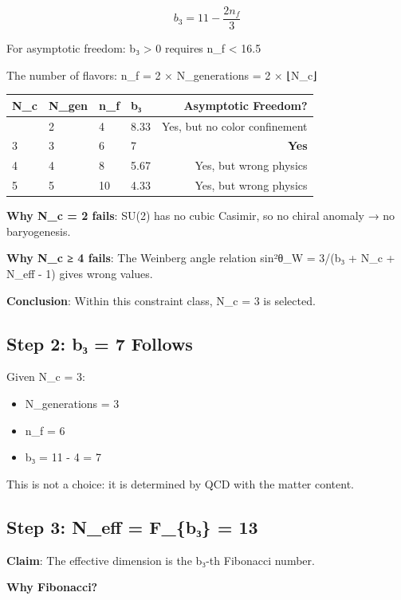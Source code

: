 \documentclass[
  11pt,
  letterpaper,
  twoside,
  openright]{book}
\providecommand{\tightlist}{%
  \setlength{\itemsep}{0pt}\setlength{\parskip}{0pt}}
\begin{document}
\[b_3 = 11 - \frac{2n_f}{3}\]

For asymptotic freedom: b₃ \textgreater{} 0 requires n\_f \textless{}
16.5

The number of flavors: n\_f = 2 × N\_generations = 2 × ⌊N\_c⌋

\begin{longtable}[]{@{}llllr@{}}
\toprule\noalign{}
N\_c & N\_gen & n\_f & b₃ & Asymptotic Freedom? \\
\midrule\noalign{}
\endhead
\bottomrule\noalign{}
\endlastfoot
2 & 2 & 4 & 8.33 & Yes, but no color confinement \\
3 & 3 & 6 & 7 & \textbf{Yes} \\
4 & 4 & 8 & 5.67 & Yes, but wrong physics \\
5 & 5 & 10 & 4.33 & Yes, but wrong physics \\
\end{longtable}

\textbf{Why N\_c = 2 fails}: SU(2) has no cubic Casimir, so no chiral
anomaly → no baryogenesis.

\textbf{Why N\_c ≥ 4 fails}: The Weinberg angle relation sin²θ\_W =
3/(b₃ + N\_c + N\_eff - 1) gives wrong values.

\textbf{Conclusion}: Within this constraint class, N\_c = 3 is selected.

\subsection{Step 2: b₃ = 7 Follows}\label{step-2-bux2083-7-follows}

Given N\_c = 3:

\begin{itemize}
\tightlist
\item
  N\_generations = 3
\item
  n\_f = 6
\item
  b₃ = 11 - 4 = 7
\end{itemize}

This is not a choice: it is determined by QCD with the matter content.

\subsection{Step 3: N\_eff = F\_\{b₃\} =
13}\label{step-3-n_eff-f_bux2083-13}

\textbf{Claim}: The effective dimension is the b₃-th Fibonacci number.

\textbf{Why Fibonacci?}
\end{document}
